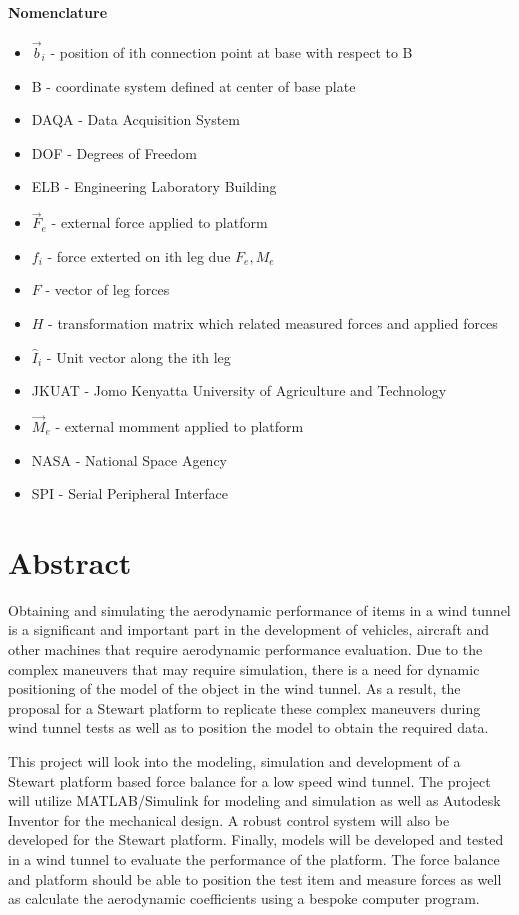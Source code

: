 \paragraph{Nomenclature}
\begin{itemize}
\item $\vec{b}_i$ - position of ith connection point at base with respect to B
\item B - coordinate system defined at center of base plate
\item DAQA - Data Acquisition System
\item DOF - Degrees of Freedom
\item ELB - Engineering Laboratory Building
\item $\vec{F}_e$ - external force applied to platform
\item $f_i$ - force exterted on ith leg due $F_e, M_e$
\item $F$ - vector of leg forces
\item $H$ - transformation matrix which related measured forces and applied forces
\item $\hat{I}_i$ - Unit vector along the ith leg 
\item JKUAT - Jomo Kenyatta University of Agriculture and Technology
\item $\vec{M}_e$ - external momment applied to platform
\item NASA - National Space Agency
\item SPI - Serial Peripheral Interface
\end{itemize}
\pagebreak
{}

\section*{Abstract}
\label{sec:Abstract}
Obtaining and simulating the aerodynamic performance of items in a wind tunnel is a
significant and important part in the development of vehicles, aircraft and other machines
that require aerodynamic performance evaluation. Due to the complex maneuvers that may require simulation, there is a need for dynamic positioning of the model of the object in the wind tunnel. As a result, the proposal for a Stewart platform to replicate these complex maneuvers during wind tunnel tests as well as to position the model to obtain the required data.

This project will look into the modeling, simulation and development of a Stewart
platform based force balance for a low speed wind tunnel. The project will utilize
MATLAB/Simulink for modeling and simulation as well as Autodesk Inventor for the mechanical
design. A robust control system will also be developed for the Stewart platform.
Finally, models will be developed and tested in a wind tunnel to evaluate the performance
of the platform. The force balance and platform should be able to position the test
item and measure forces as well as calculate the aerodynamic coefficients using a bespoke computer program.




